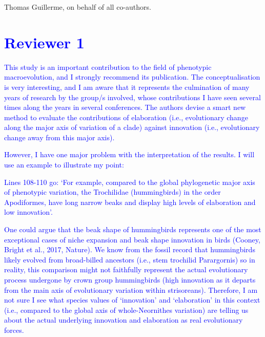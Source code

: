 \documentclass[12pt,letterpaper]{article}
\begin{document}
\noindent Thomas Guillerme, on behalf of all co-authors.

\section*{\textcolor{blue}{Reviewer 1}}

\textcolor{blue}{This study is an important contribution to the field of phenotypic macroevolution, and I strongly recommend its publication. The conceptualisation is very interesting, and I am aware that it represents the culmination of many years of research by the group/s involved, whose contributions I have seen several times along the years in several conferences. The authors devise a smart new method to evaluate the contributions of elaboration (i.e., evolutionary change along the major axis of variation of a clade) against innovation (i.e., evolutionary change away from this major axis).}

\textcolor{blue}{However, I have one major problem with the interpretation of the results. I will use an example to illustrate my point:}

\textcolor{blue}{Lines 108-110 go: ‘For example, compared to the global phylogenetic major axis of phenotypic variation, the Trochilidae (hummingbirds) in the order Apodiformes, have long narrow beaks and display high levels of elaboration and low innovation’.}

\textcolor{blue}{One could argue that the beak shape of hummingbirds represents one of the most exceptional cases of niche expansion and beak shape innovation in birds (Cooney, Bright et al., 2017, Nature). We know from the fossil record that hummingbirds likely evolved from broad-billed ancestors (i.e., stem trochilid Parargornis) so in reality, this comparison might not faithfully represent the actual evolutionary process undergone by crown group hummingbirds (high innovation as it departs from the main axis of evolutionary variation within strisoreans). Therefore, I am not sure I see what species values of ‘innovation’ and ‘elaboration’ in this context (i.e., compared to the global axis of whole-Neornithes variation) are telling us about the actual underlying innovation and elaboration as real evolutionary forces.}
\end{document}
